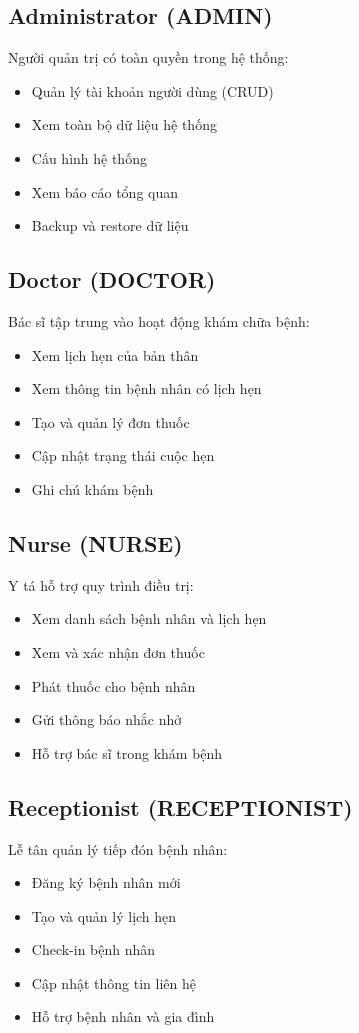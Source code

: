 \documentclass[12pt,a4paper]{report}
\begin{document}
\subsection{Administrator (ADMIN)}
Người quản trị có toàn quyền trong hệ thống:
\begin{itemize}
    \item Quản lý tài khoản người dùng (CRUD)
    \item Xem toàn bộ dữ liệu hệ thống
    \item Cấu hình hệ thống
    \item Xem báo cáo tổng quan
    \item Backup và restore dữ liệu
\end{itemize}

\subsection{Doctor (DOCTOR)}
Bác sĩ tập trung vào hoạt động khám chữa bệnh:
\begin{itemize}
    \item Xem lịch hẹn của bản thân
    \item Xem thông tin bệnh nhân có lịch hẹn
    \item Tạo và quản lý đơn thuốc
    \item Cập nhật trạng thái cuộc hẹn
    \item Ghi chú khám bệnh
\end{itemize}

\subsection{Nurse (NURSE)}
Y tá hỗ trợ quy trình điều trị:
\begin{itemize}
    \item Xem danh sách bệnh nhân và lịch hẹn
    \item Xem và xác nhận đơn thuốc
    \item Phát thuốc cho bệnh nhân
    \item Gửi thông báo nhắc nhở
    \item Hỗ trợ bác sĩ trong khám bệnh
\end{itemize}

\subsection{Receptionist (RECEPTIONIST)}
Lễ tân quản lý tiếp đón bệnh nhân:
\begin{itemize}
    \item Đăng ký bệnh nhân mới
    \item Tạo và quản lý lịch hẹn
    \item Check-in bệnh nhân
    \item Cập nhật thông tin liên hệ
    \item Hỗ trợ bệnh nhân và gia đình
\end{itemize}
\end{document}

